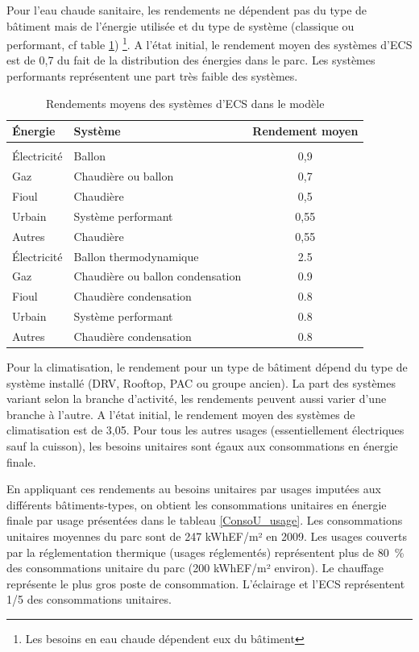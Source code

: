 \documentclass[10.5pt,a4paper]{article}
\begin{document}
{Pour l'eau chaude sanitaire, les rendements ne dépendent pas du type de bâtiment mais de l'énergie utilisée et du type de système (classique ou performant, cf table \ref{RdtsystECS}) \footnote{Les besoins en eau chaude dépendent eux du bâtiment}. A l'état initial, le rendement moyen des systèmes d'ECS est de 0,7 du fait de la distribution des énergies dans le parc. Les systèmes performants représentent une part très faible des systèmes. 

\begin{table}[ht]
\caption{Rendements moyens des systèmes d'ECS dans le modèle}
\label{RdtsystECS}
\begin{center}
\begin{tabular}{l|l|c}
\textbf{Énergie}	& \textbf{Système}	&	\textbf{Rendement moyen}
\\	\hline	\\	
Électricité	 & Ballon &  0,9\\	
Gaz	& Chaudière ou ballon & 0,7\\	
Fioul	& Chaudière & 0,5\\	
Urbain	& Système performant &  0,55\\	
Autres	& Chaudière & 0,55 \\	
Électricité	 & Ballon thermodynamique	& 2.5 \\	
Gaz	& Chaudière ou ballon condensation	& 0.9 \\	
Fioul	& Chaudière condensation	& 0.8 \\	
Urbain	& Système performant	& 0.8 \\	
Autres	& Chaudière condensation	& 0.8 \\	
\hline	
\end{tabular}
\end{center}
\end{table}

Pour la climatisation, le rendement pour un type de bâtiment dépend du type de système installé (DRV, Rooftop, PAC ou groupe ancien). La part des systèmes variant selon la branche d'activité, les rendements peuvent aussi varier d'une branche à l'autre. A l'état initial, le rendement moyen des systèmes de climatisation est de 3,05. Pour tous les autres usages (essentiellement électriques sauf la cuisson), les besoins unitaires sont égaux aux consommations en énergie finale. 

En appliquant ces rendements au besoins unitaires par usages imputées aux différents bâtiments-types, on obtient les consommations unitaires en énergie finale par usage présentées dans le tableau \ref{ConsoU_usage}. Les consommations unitaires moyennes du parc sont de 247 kWhEF/m² en 2009. Les usages couverts par la réglementation thermique (usages réglementés) représentent plus de 80~\% des consommations unitaire du parc (200 kWhEF/m² environ). Le chauffage représente le plus gros poste de consommation. L'éclairage et l'ECS représentent 1/5 des consommations unitaires. 

}
\end{document}
